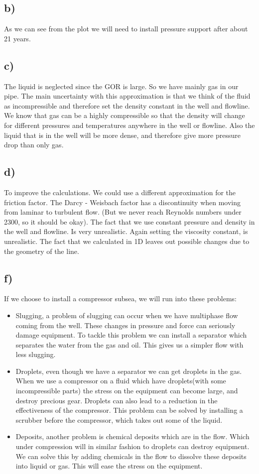 \documentclass[DIV=calc, paper=a4, fontsize=13pt, twocolumn]{scrartcl}	 %
\begin{document}
\subsection*{b)}
As we can see from the plot we will need to install pressure support after about 21 years.
\subsection*{c)}
The liquid is neglected since the GOR is large. So we have mainly gas in our pipe. The main uncertainty with this approximation is that we think of the fluid as incompressible and therefore set the density constant in the well and flowline. We know that gas can be a highly compressible so that the density will change for different pressures and temperatures anywhere in the well or flowline.
\newline
Also the liquid that is in the well will be more dense, and therefore give more pressure drop than only gas.
\subsection*{d)}
To improve the calculations. We could use a different approximation for the friction factor. The Darcy - Weisbach factor has a discontinuity when moving from laminar to turbulent flow. (But we never reach Reynolds numbers under 2300, so it should be okay). 
\newline
The fact that we use constant pressure and density in the well and flowline. Is very unrealistic. Again setting the viscosity constant, is unrealistic.
\newline
The fact that we calculated in 1D leaves out possible changes due to the geometry of the line.
\subsection*{f)}
If we choose to install a compressor subsea, we will run into these problems:
\begin{itemize}
\item Slugging, a problem of slugging can occur when we have multiphase flow coming from the well. These changes in pressure and force can seriously damage equipment. To tackle this problem we can install a separator which separates the water from the gas and oil. This gives us a simpler flow with less slugging.
\item Droplets, even though we have a separator we can get droplets in the gas. When we use a compressor on a fluid which have droplets(with some incompressible parts) the stress on the equipment can become large, and destroy precious gear. Droplets can also lead to a reduction in the effectiveness of the compressor. This problem can be solved by installing a scrubber before the compressor, which takes out some of the liquid.
\item Deposits, another problem is chemical deposits which are in the flow. Which under compression will in similar fashion to droplets can destroy equipment. We can solve this by adding chemicals in the flow to dissolve these deposits into liquid or gas. This will ease the stress on the equipment.
\end{itemize}
\end{document}
